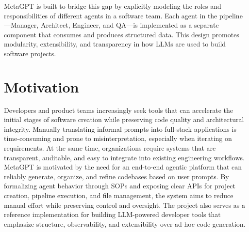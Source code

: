 MetaGPT is built to bridge this gap by explicitly modeling the roles and responsibilities of different agents in a software team. Each agent in the pipeline---Manager, Architect, Engineer, and QA---is implemented as a separate component that consumes and produces structured data. This design promotes modularity, extensibility, and transparency in how LLMs are used to build software projects.\\



\section{Motivation}

Developers and product teams increasingly seek tools that can accelerate the initial stages of software creation while preserving code quality and architectural integrity. Manually translating informal prompts into full-stack applications is time-consuming and prone to misinterpretation, especially when iterating on requirements. At the same time, organizations require systems that are transparent, auditable, and easy to integrate into existing engineering workflows.\\

MetaGPT is motivated by the need for an end-to-end agentic platform that can reliably generate, organize, and refine codebases based on user prompts. By formalizing agent behavior through SOPs and exposing clear APIs for project creation, pipeline execution, and file management, the system aims to reduce manual effort while preserving control and oversight. The project also serves as a reference implementation for building LLM-powered developer tools that emphasize structure, observability, and extensibility over ad-hoc code generation.\\


